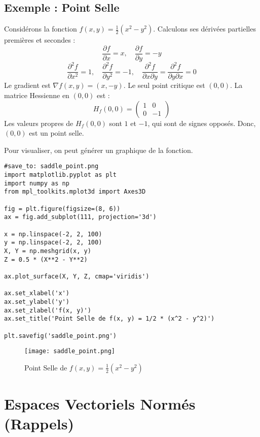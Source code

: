 \documentclass{article}
\begin{document}
\subsection{Exemple : Point Selle}
Considérons la fonction $f(x, y) = \frac{1}{2}(x^2 - y^2)$. Calculons ses dérivées partielles premières et secondes :
\[ \frac{\partial f}{\partial x} = x, \quad \frac{\partial f}{\partial y} = -y \]
\[ \frac{\partial^2 f}{\partial x^2} = 1, \quad \frac{\partial^2 f}{\partial y^2} = -1, \quad \frac{\partial^2 f}{\partial x \partial y} = \frac{\partial^2 f}{\partial y \partial x} = 0 \]
Le gradient est $\nabla f(x, y) = (x, -y)$. Le seul point critique est $(0, 0)$. La matrice Hessienne en $(0, 0)$ est :
\[ H_f(0, 0) = \begin{pmatrix} 1 & 0 \\ 0 & -1 \end{pmatrix} \]
Les valeurs propres de $H_f(0, 0)$ sont $1$ et $-1$, qui sont de signes opposés. Donc, $(0, 0)$ est un point selle.

Pour visualiser, on peut générer un graphique de la fonction.
\begin{verbatim}
#save_to: saddle_point.png
import matplotlib.pyplot as plt
import numpy as np
from mpl_toolkits.mplot3d import Axes3D

fig = plt.figure(figsize=(8, 6))
ax = fig.add_subplot(111, projection='3d')

x = np.linspace(-2, 2, 100)
y = np.linspace(-2, 2, 100)
X, Y = np.meshgrid(x, y)
Z = 0.5 * (X**2 - Y**2)

ax.plot_surface(X, Y, Z, cmap='viridis')

ax.set_xlabel('x')
ax.set_ylabel('y')
ax.set_zlabel('f(x, y)')
ax.set_title('Point Selle de f(x, y) = 1/2 * (x^2 - y^2)')

plt.savefig('saddle_point.png')
\end{verbatim}

\begin{figure}[h]
\centering
\texttt{[image: saddle\_point.png]}
\caption{Point Selle de $f(x, y) = \frac{1}{2} (x^2 - y^2)$}
\label{fig:saddle_point}
\end{figure}


\section{Espaces Vectoriels Normés (Rappels)}
\end{document}
